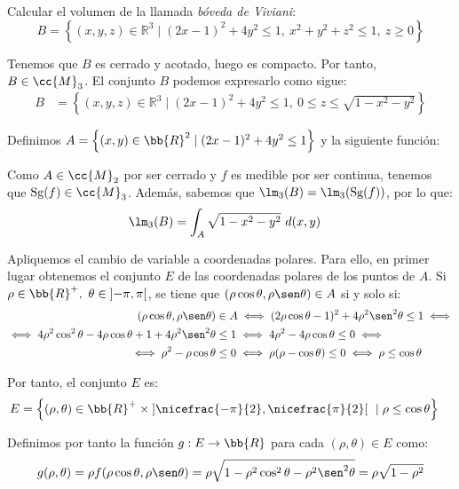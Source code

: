 \begin{ejercicio}
    Calcular el volumen de la llamada \emph{bóveda de Viviani}:
    \[ B = \left\{ (x, y, z) \in \mathbb{R}^3 \mid (2x - 1)^2 + 4y^2 \leq 1 ,~x^2 + y^2 + z^2 \leq 1 ,~z \geq 0 \right\} \]

    Tenemos que $B$ es cerrado y acotado, luego es compacto. Por tanto, $B\in \cc{M}_3$.
    El conjunto $B$ podemos expresarlo como sigue:
    \begin{align*}
        B &= \left\{ (x, y, z) \in \mathbb{R}^3 \mid (2x - 1)^2 + 4y^2 \leq 1,~0\leq z\leq \sqrt{1 - x^2 - y^2} \right\}
    \end{align*}

    Definimos $A=\left\{ (x, y) \in \bb{R}^2 \mid (2x - 1)^2 + 4y^2 \leq 1 \right\}$ y la siguiente función:

    Como $A\in \cc{M}_2$ por ser cerrado y $f$ es medible por ser continua,
    tenemos que $\text{Sg}(f)\in \cc{M}_3$. Además, sabemos que $\lm_3(B)=\lm_3(\text{Sg}(f))$, 
    por lo que:
    \begin{align*}
        \lm_3(B) &= \int_A \sqrt{1 - x^2 - y^2}~d(x, y)
    \end{align*}

    Apliquemos el cambio de variable a coordenadas polares. Para ello, en primer
    lugar obtenemos el conjunto $E$ de las coordenadas polares de los puntos de $A$.
    Si $\rho\in \bb{R}^+,~\theta\in \left]-\pi, \pi\right[$, se tiene que
    $(\rho\cos\theta, \rho\sen\theta)\in A$ si y solo si:
    \begin{align*}
        (\rho\cos\theta, \rho\sen\theta) &\in A \iff (2\rho\cos\theta - 1)^2 + 4\rho^2\sen^2\theta \leq 1 \iff\\
        \iff 4\rho^2\cos^2\theta - 4\rho\cos\theta + 1 + 4\rho^2\sen^2\theta &\leq 1 \iff 4\rho^2 - 4\rho\cos\theta \leq 0 \iff\\
        \iff \rho^2 - \rho\cos\theta &\leq 0 \iff \rho(\rho - \cos\theta) \leq 0 \iff \rho \leq \cos\theta
    \end{align*}

    Por tanto, el conjunto $E$ es:
    \begin{align*}
        E &= \left\{ (\rho, \theta) \in \bb{R}^+\times \left]\nicefrac{-\pi}{2}, \nicefrac{\pi}{2}\right[ ~\mid \rho \leq \cos\theta \right\}
    \end{align*}

    Definimos por tanto la función $g: E \to \bb{R}$ para cada $(\rho, \theta) \in E$ como:
    \begin{equation*}
        g(\rho, \theta) = \rho f(\rho\cos\theta, \rho\sen\theta) = \rho\sqrt{1 - \rho^2\cos^2\theta - \rho^2\sen^2\theta} = \rho\sqrt{1 - \rho^2}
    \end{equation*}


\end{ejercicio}
